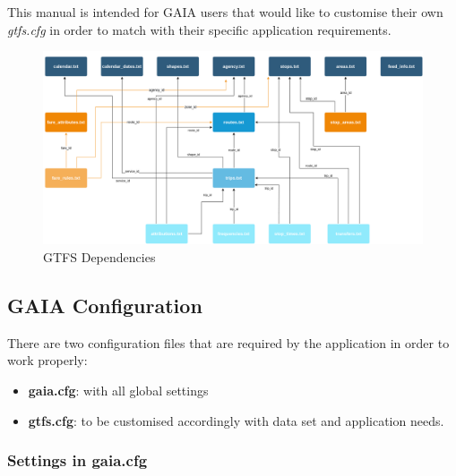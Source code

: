 \documentclass[12pt, a4paper]{book}
\begin{document}
\begin{justify}
This manual is intended for GAIA users that would like to customise their own \textit{gtfs.cfg} in order to match with their specific application requirements.
\end{justify}



\begin{figure}[h]
    \centering
    \includegraphics[width=1.0\textwidth]{GTFS Diagram}
    \caption{GTFS Dependencies}
    \label{fig:figure1}
\end{figure}



\newpage
\subsection{GAIA Configuration}

\begin{justify}
There are two configuration files that are required by the application in order to work properly:
\begin{itemize}
\item \textbf{gaia.cfg}: with all global settings
\item \textbf{gtfs.cfg}: to be customised accordingly with data set and application needs.
\end{itemize}
\end{justify}

\subsubsection{Settings in gaia.cfg}
\end{document}
